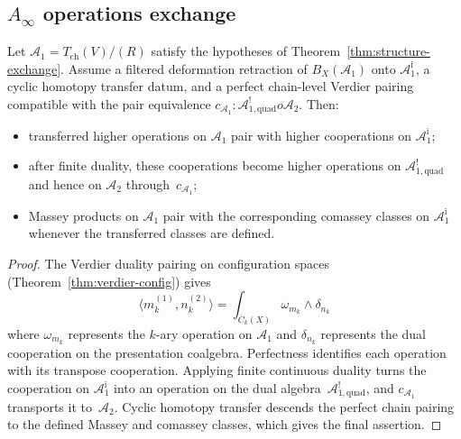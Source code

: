 \subsection{\texorpdfstring{$A_\infty$ operations exchange}{A-infinity operations exchange}}

\begin{theorem}
\label{thm:ainfty-duality-exchange}
Let $\mathcal A_1=T_{\mathrm{ch}}(V)/(R)$ satisfy the hypotheses of
Theorem~\ref{thm:structure-exchange}.  Assume a filtered deformation
retraction of $B_X(\mathcal A_1)$ onto
$\mathcal A_1^{\mathrm i}$, a cyclic homotopy transfer datum, and a
perfect chain-level Verdier pairing compatible with the pair
equivalence
$c_{\mathcal A_1}\colon\mathcal A^!_{1,\mathrm{quad}}	o
\mathcal A_2$. Then:
\begin{itemize}
\item transferred higher operations on $\mathcal{A}_1$ pair with
 higher cooperations on $\mathcal{A}_1^{\mathrm i}$;
\item after finite duality, these cooperations become higher
 operations on $\mathcal{A}^!_{1,\mathrm{quad}}$ and hence on
 $\mathcal A_2$ through~$c_{\mathcal A_1}$;
\item Massey products on $\mathcal{A}_1$ pair with the corresponding
 comassey classes on $\mathcal{A}_1^{\mathrm i}$ whenever the
 transferred classes are defined.
\end{itemize}
\end{theorem}

\begin{proof}
The Verdier duality pairing on configuration spaces
(Theorem~\ref{thm:verdier-config}) gives
\[
\langle m_k^{(1)}, n_k^{(2)} \rangle = \int_{\overline{C}_k(X)} \omega_{m_k} \wedge \delta_{n_k}
\]
where $\omega_{m_k}$ represents the $k$-ary operation on
$\mathcal{A}_1$ and $\delta_{n_k}$ represents the dual cooperation on
the presentation coalgebra. Perfectness identifies each operation
with its transpose cooperation. Applying finite continuous duality turns the
cooperation on $\mathcal{A}_1^{\mathrm i}$ into an operation on the dual
algebra~$\mathcal{A}^!_{1,\mathrm{quad}}$, and
$c_{\mathcal A_1}$ transports it to~$\mathcal A_2$.  Cyclic homotopy
transfer descends the perfect chain pairing to the defined Massey and
comassey classes, which gives the final assertion.
\end{proof}


